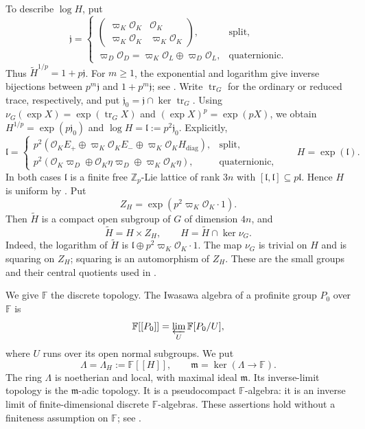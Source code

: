 \documentclass[11pt]{article}
\numberwithin{equation}{section}
\theoremstyle{definition}
\theoremstyle{remark}
\newcommand{\F}{\mathbb F}
\newcommand{\Z}{\mathbb Z}
\newcommand{\cO}{\mathcal O}
\newcommand{\fm}{\mathfrak m}
\begin{document}
To describe $\log H$, put
\[
 \mathfrak j=
 \begin{cases}
  \begin{pmatrix}
   \varpi_K\cO_K&\cO_K\\
   \varpi_K\cO_K&\varpi_K\cO_K
  \end{pmatrix},&\text{split},\\[6pt]
  \varpi_D\cO_D
    =\varpi_K\cO_L\oplus\varpi_D\cO_L,&\text{quaternionic}.
 \end{cases}
\]
Thus $\widetilde H^{1/p}=1+p\mathfrak j$.
For $m\geq1$, the exponential and logarithm give inverse bijections
between $p^m\mathfrak j$ and $1+p^m\mathfrak j$; see
\cite[\S\S~3.1 and 6.2]{Sor26b}.
Write $\operatorname{tr}_G$ for the ordinary or reduced trace,
respectively, and put $\mathfrak j_0=\mathfrak j\cap\ker\operatorname{tr}_G$.
Using $\nu_G(\exp X)=\exp(\operatorname{tr}_G X)$ and
$(\exp X)^p=\exp(pX)$, we obtain
$H^{1/p}=\exp(p\mathfrak j_0)$ and $\log H=\mathfrak l:=p^2\mathfrak j_0$.
Explicitly,
\begin{equation}\label{eq:compact-subgroups}
 \mathfrak l=
 \begin{cases}
  p^2(\cO_KE_+\oplus\varpi_K\cO_KE_-
                   \oplus\varpi_K\cO_KH_{\mathrm{diag}}),&\text{split},\\
  p^2(\cO_K\varpi_D\oplus\cO_K\eta\varpi_D
                   \oplus\varpi_K\cO_K\eta),&\text{quaternionic},
 \end{cases}
 \qquad H=\exp(\mathfrak l).
\end{equation}
In both cases $\mathfrak l$ is a finite free $\Z_p$-Lie lattice
of rank $3n$ with $[\mathfrak l,\mathfrak l]\subseteq p\mathfrak l$.
Hence $H$ is uniform by \cite[Thm.~9.10]{DDMS99}.
Put
\[
 Z_H=\exp(p^2\varpi_K\cO_K\cdot1).
\]
Then $\widetilde H$ is a compact open subgroup of $G$ of dimension $4n$,
and
\begin{equation}\label{eq:norm-one-realization}
 \widetilde H=H\times Z_H,\qquad H=\widetilde H\cap\ker\nu_G.
\end{equation}
Indeed, the logarithm of $\widetilde H$ is
$\mathfrak l\oplus p^2\varpi_K\cO_K\cdot1$.
The map $\nu_G$ is trivial on $H$ and is squaring on
$Z_H$; squaring is an automorphism of $Z_H$. These are the small
groups and their central quotients used in \cite[\S\S~6.2 and 6.5]{Sor26b}.

We give $\F$ the discrete topology. The Iwasawa algebra of a
profinite group $P_0$ over $\F$ is
\[
 \F[[P_0]]=\varprojlim_U\F[P_0/U],
\]
where $U$ runs over its open normal subgroups. We put
\[
 \Lambda=\Lambda_H:=\F[[H]],\qquad \fm=\ker(\Lambda\longrightarrow\F).
\]
The ring $\Lambda$ is noetherian and local, with maximal ideal $\fm$.
Its inverse-limit topology is the $\fm$-adic topology. It is a
pseudocompact $\F$-algebra: it is an inverse limit of
finite-dimensional discrete $\F$-algebras. These assertions hold
without a finiteness assumption on $\F$; see
\cite[Prop.~1.9 and Thm.~3.1]{Koh17}.
\end{document}

